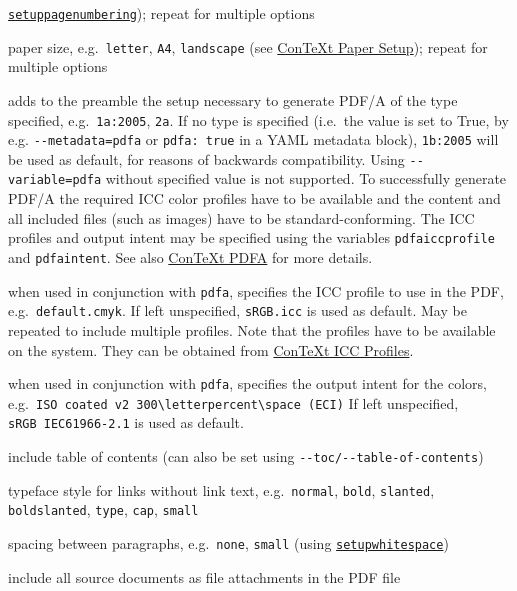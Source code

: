 \documentclass[
  b5paper
]{book}
\begin{document}
\begin{description}
\href{https://wiki.contextgarden.net/Command/setuppagenumbering}{\texttt{setuppagenumbering}});
repeat for multiple options
\item[\texttt{papersize}]
paper size, e.g.~\texttt{letter}, \texttt{A4}, \texttt{landscape} (see
\href{https://wiki.contextgarden.net/PaperSetup}{ConTeXt Paper Setup});
repeat for multiple options
\item[\texttt{pdfa}]
adds to the preamble the setup necessary to generate PDF/A of the type
specified, e.g.~\texttt{1a:2005}, \texttt{2a}. If no type is specified
(i.e.~the value is set to True, by e.g. \texttt{-\/-metadata=pdfa} or
\texttt{pdfa:\ true} in a YAML metadata block), \texttt{1b:2005} will be
used as default, for reasons of backwards compatibility. Using
\texttt{-\/-variable=pdfa} without specified value is not supported. To
successfully generate PDF/A the required ICC color profiles have to be
available and the content and all included files (such as images) have
to be standard-conforming. The ICC profiles and output intent may be
specified using the variables \texttt{pdfaiccprofile} and
\texttt{pdfaintent}. See also
\href{https://wiki.contextgarden.net/PDF/A}{ConTeXt PDFA} for more
details.
\item[\texttt{pdfaiccprofile}]
when used in conjunction with \texttt{pdfa}, specifies the ICC profile
to use in the PDF, e.g.~\texttt{default.cmyk}. If left unspecified,
\texttt{sRGB.icc} is used as default. May be repeated to include
multiple profiles. Note that the profiles have to be available on the
system. They can be obtained from
\href{https://wiki.contextgarden.net/PDFX\#ICC_profiles}{ConTeXt ICC
Profiles}.
\item[\texttt{pdfaintent}]
when used in conjunction with \texttt{pdfa}, specifies the output intent
for the colors,
e.g.~\texttt{ISO\ coated\ v2\ 300\textbackslash{}letterpercent\textbackslash{}space\ (ECI)}
If left unspecified, \texttt{sRGB\ IEC61966-2.1} is used as default.
\item[\texttt{toc}]
include table of contents (can also be set using
\texttt{-\/-toc/-\/-table-of-contents})
\item[\texttt{urlstyle}]
typeface style for links without link text, e.g.~\texttt{normal},
\texttt{bold}, \texttt{slanted}, \texttt{boldslanted}, \texttt{type},
\texttt{cap}, \texttt{small}
\item[\texttt{whitespace}]
spacing between paragraphs, e.g.~\texttt{none}, \texttt{small} (using
\href{https://wiki.contextgarden.net/Command/setupwhitespace}{\texttt{setupwhitespace}})
\item[\texttt{includesource}]
include all source documents as file attachments in the PDF file
\end{description}
\end{document}
